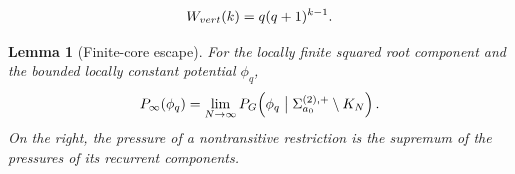 \documentclass[10pt,a4paper]{amsart}
\newtheorem{lemma}{Lemma}
\begin{document}
\begin{equation}\label{eq:excursionweight}
 W_{\rm vert}(k)=q(q+1)^{k-1}.
\end{equation}

\begin{lemma}[Finite-core escape]
\label{lem:finite-core-escape}
For the locally finite squared root component and the bounded locally constant
potential $\phi_q$,
\begin{equation}\label{eq:finite-core-pressure-limit}
 P_\infty(\phi_q)
 =\lim_{N\to\infty}
 P_G\!\left(\phi_q\bigm|
 \Sigma^{(2),+}_{a_0}\setminus K_N\right).
\end{equation}
On the right, the pressure of a nontransitive restriction is the supremum of
the pressures of its recurrent components.
\end{lemma}
\end{document}
